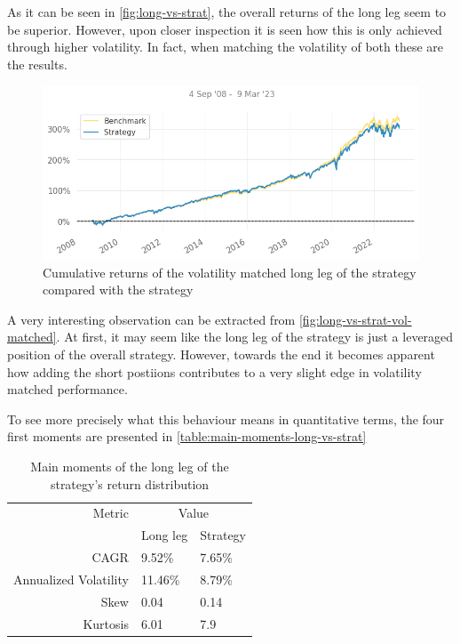 As it can be seen in \autoref{fig:long-vs-strat}, the overall returns of the long leg seem to be superior. However, upon closer inspection it is seen how this is only achieved through higher volatility. In fact, when matching the volatility of both these are the results.

\begin{figure}[ht]
    \includegraphics[width=\linewidth]{assets/long-vs-strat-vol-matched.png}
    \caption{Cumulative returns of the volatility matched long leg of the strategy compared with the strategy}
    \label{fig:long-vs-strat-vol-matched}
\end{figure}

A very interesting observation can be extracted from \autoref{fig:long-vs-strat-vol-matched}. At first, it may seem like the long leg of the strategy is just a leveraged position of the overall strategy. However, towards the end it becomes apparent how adding the short postiions contributes to a very slight edge in volatility matched performance.

To see more precisely what this behaviour means in quantitative terms, the four first moments are presented in \autoref{table:main-moments-long-vs-strat}

\begin{table}[ht]
    \centering
    \begin{tabular}{rll}
        \toprule
        Metric & \multicolumn{2}{c}{Value} \\ 
        \cmidrule(lr){2-3}
            & Long leg & Strategy \\
        \midrule
        CAGR & 9.52\% & 7.65\% \\
        Annualized Volatility & 11.46\% & 8.79\% \\
        Skew & 0.04 & 0.14 \\
        Kurtosis & 6.01 & 7.9 \\
        \bottomrule
    \end{tabular}
    \caption{Main moments of the long leg of the strategy's return distribution}
    \label{table:main-moments-long-vs-strat}
\end{table}

